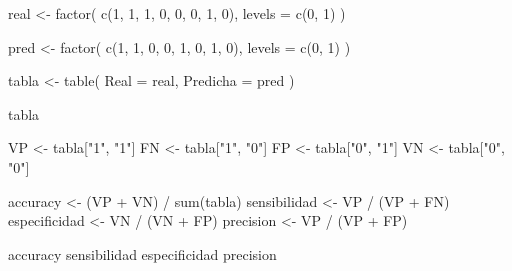 \documentclass[
  spanish,
  10.5pt,
  letterpaper,
  DIV=11,
  numbers=noendperiod,
  oneside,
  open=any]{scrreprt}
\newenvironment{Shaded}{\begin{snugshade}}{\end{snugshade}}
\newcommand{\AttributeTok}[1]{\textcolor[rgb]{0.40,0.45,0.13}{#1}}
\newcommand{\DecValTok}[1]{\textcolor[rgb]{0.68,0.00,0.00}{#1}}
\newcommand{\FunctionTok}[1]{\textcolor[rgb]{0.28,0.35,0.67}{#1}}
\newcommand{\NormalTok}[1]{\textcolor[rgb]{0.00,0.23,0.31}{#1}}
\newcommand{\OtherTok}[1]{\textcolor[rgb]{0.00,0.23,0.31}{#1}}
\newcommand{\SpecialCharTok}[1]{\textcolor[rgb]{0.37,0.37,0.37}{#1}}
\newcommand{\StringTok}[1]{\textcolor[rgb]{0.13,0.47,0.30}{#1}}
\theoremstyle{definition}
\theoremstyle{definition}
\theoremstyle{plain}
\theoremstyle{remark}
\begin{document}
\begin{Shaded}
\begin{Highlighting}[numbers=left,,]
\NormalTok{real }\OtherTok{\textless{}{-}} \FunctionTok{factor}\NormalTok{(}
  \FunctionTok{c}\NormalTok{(}\DecValTok{1}\NormalTok{, }\DecValTok{1}\NormalTok{, }\DecValTok{1}\NormalTok{, }\DecValTok{0}\NormalTok{, }\DecValTok{0}\NormalTok{, }\DecValTok{0}\NormalTok{, }\DecValTok{1}\NormalTok{, }\DecValTok{0}\NormalTok{),}
  \AttributeTok{levels =} \FunctionTok{c}\NormalTok{(}\DecValTok{0}\NormalTok{, }\DecValTok{1}\NormalTok{)}
\NormalTok{)}

\NormalTok{pred }\OtherTok{\textless{}{-}} \FunctionTok{factor}\NormalTok{(}
  \FunctionTok{c}\NormalTok{(}\DecValTok{1}\NormalTok{, }\DecValTok{1}\NormalTok{, }\DecValTok{0}\NormalTok{, }\DecValTok{0}\NormalTok{, }\DecValTok{1}\NormalTok{, }\DecValTok{0}\NormalTok{, }\DecValTok{1}\NormalTok{, }\DecValTok{0}\NormalTok{),}
  \AttributeTok{levels =} \FunctionTok{c}\NormalTok{(}\DecValTok{0}\NormalTok{, }\DecValTok{1}\NormalTok{)}
\NormalTok{)}

\NormalTok{tabla }\OtherTok{\textless{}{-}} \FunctionTok{table}\NormalTok{(}
  \AttributeTok{Real =}\NormalTok{ real,}
  \AttributeTok{Predicha =}\NormalTok{ pred}
\NormalTok{)}

\NormalTok{tabla}

\NormalTok{VP }\OtherTok{\textless{}{-}}\NormalTok{ tabla[}\StringTok{"1"}\NormalTok{, }\StringTok{"1"}\NormalTok{]}
\NormalTok{FN }\OtherTok{\textless{}{-}}\NormalTok{ tabla[}\StringTok{"1"}\NormalTok{, }\StringTok{"0"}\NormalTok{]}
\NormalTok{FP }\OtherTok{\textless{}{-}}\NormalTok{ tabla[}\StringTok{"0"}\NormalTok{, }\StringTok{"1"}\NormalTok{]}
\NormalTok{VN }\OtherTok{\textless{}{-}}\NormalTok{ tabla[}\StringTok{"0"}\NormalTok{, }\StringTok{"0"}\NormalTok{]}

\NormalTok{accuracy }\OtherTok{\textless{}{-}}\NormalTok{ (VP }\SpecialCharTok{+}\NormalTok{ VN) }\SpecialCharTok{/} \FunctionTok{sum}\NormalTok{(tabla)}
\NormalTok{sensibilidad }\OtherTok{\textless{}{-}}\NormalTok{ VP }\SpecialCharTok{/}\NormalTok{ (VP }\SpecialCharTok{+}\NormalTok{ FN)}
\NormalTok{especificidad }\OtherTok{\textless{}{-}}\NormalTok{ VN }\SpecialCharTok{/}\NormalTok{ (VN }\SpecialCharTok{+}\NormalTok{ FP)}
\NormalTok{precision }\OtherTok{\textless{}{-}}\NormalTok{ VP }\SpecialCharTok{/}\NormalTok{ (VP }\SpecialCharTok{+}\NormalTok{ FP)}

\NormalTok{accuracy}
\NormalTok{sensibilidad}
\NormalTok{especificidad}
\NormalTok{precision}
\end{Highlighting}
\end{Shaded}
\end{document}
